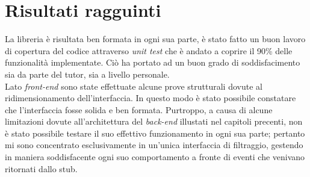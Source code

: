 \section{Risultati ragguinti}
La libreria è risultata ben formata in ogni sua parte, è stato fatto un buon lavoro di copertura del codice attraverso \textit{\gls{unit test}} che è andato a coprire il 90\% delle funzionalità implementate. Ciò ha portato ad un buon grado di soddisfacimento sia da parte del tutor, sia a livello personale.\\
Lato \textit{front-end} sono state effettuate alcune prove strutturali dovute al ridimensionamento dell'interfaccia. In questo modo è stato possibile constatare che l'interfaccia fosse solida e ben formata. Purtroppo, a causa di alcune limitazioni dovute all'architettura del \textit{back-end} illustati nel capitoli precenti, non è stato possibile testare il suo effettivo funzionamento in ogni sua parte; pertanto mi sono concentrato esclusivamente in un'unica interfaccia di filtraggio, gestendo in maniera soddisfacente ogni suo comportamento a fronte di eventi che venivano ritornati dallo stub. 